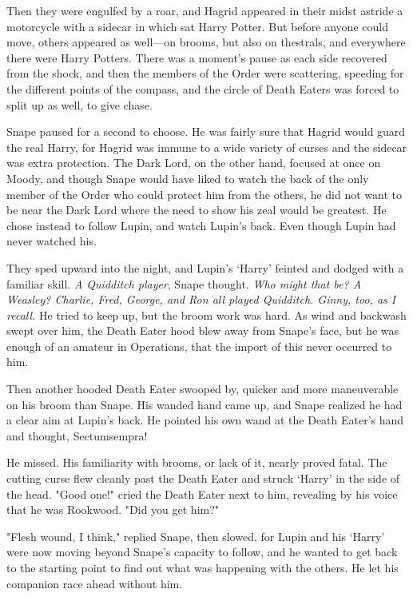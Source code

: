 Then they were engulfed by a roar, and Hagrid appeared in their midst astride a motorcycle with a sidecar in which sat Harry Potter. But before anyone could move, others appeared as well—on brooms, but also on thestrals, and everywhere there were Harry Potters. There was a moment's pause as each side recovered from the shock, and then the members of the Order were scattering, speeding for the different points of the compass, and the circle of Death Eaters was forced to split up as well, to give chase.

Snape paused for a second to choose. He was fairly sure that Hagrid would guard the real Harry, for Hagrid was immune to a wide variety of curses and the sidecar was extra protection. The Dark Lord, on the other hand, focused at once on Moody, and though Snape would have liked to watch the back of the only member of the Order who could protect him from the others, he did not want to be near the Dark Lord where the need to show his zeal would be greatest. He chose instead to follow Lupin, and watch Lupin's back. Even though Lupin had never watched his.

They sped upward into the night, and Lupin's `Harry' feinted and dodged with a familiar skill. \emph{A Quidditch player}, Snape thought. \emph{Who might that be? A Weasley? Charlie, Fred, George, and Ron all played Quidditch. Ginny, too, as I recall.} He tried to keep up, but the broom work was hard. As wind and backwash swept over him, the Death Eater hood blew away from Snape's face, but he was enough of an amateur in Operations, that the import of this never occurred to him.

Then another hooded Death Eater swooped by, quicker and more maneuverable on his broom than Snape. His wanded hand came up, and Snape realized he had a clear aim at Lupin's back. He pointed his own wand at the Death Eater's hand and thought, Sectumsempra!

He missed. His familiarity with brooms, or lack of it, nearly proved fatal. The cutting curse flew cleanly past the Death Eater and struck `Harry' in the side of the head. "Good one!" cried the Death Eater next to him, revealing by his voice that he was Rookwood. "Did you get him?"

"Flesh wound, I think," replied Snape, then slowed, for Lupin and his `Harry' were now moving beyond Snape's capacity to follow, and he wanted to get back to the starting point to find out what was happening with the others. He let his companion race ahead without him.

